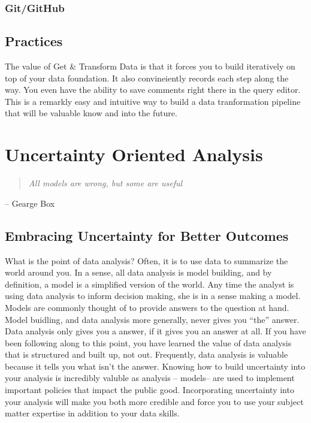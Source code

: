 \documentclass[]{book}
\begin{document}
\hypertarget{gitgithub}{%
\subsection{Git/GitHub}\label{gitgithub}}

\hypertarget{practices}{%
\section{Practices}\label{practices}}

The value of Get \& Transform Data is that it forces you to build iteratively on top of your data foundation. It also convineiently records each step along the way. You even have the ability to save comments right there in the query editor. This is a remarkly easy and intuitive way to build a data tranformation pipeline that will be valuable know and into the future.

\hypertarget{uncertainty-oriented-analysis}{%
\chapter{Uncertainty Oriented Analysis}\label{uncertainty-oriented-analysis}}

\begin{quote}
\emph{All models are wrong, but some are useful}
\end{quote}

-- Gearge Box

\hypertarget{embracing-uncertainty-for-better-outcomes}{%
\section{Embracing Uncertainty for Better Outcomes}\label{embracing-uncertainty-for-better-outcomes}}

What is the point of data analysis? Often, it is to use data to summarize the world around you. In a sense, all data analysis is model building, and by definition, a model is a simplified version of the world. Any time the analyst is using data analysis to inform decision making, she is in a sense making a model. Models are commonly thought of to provide answers to the question at hand. Model buidling, and data analysis more generally, never gives you ``the'' answer. Data analysis only gives you a answer, if it gives you an answer at all. If you have been following along to this point, you have learned the value of data analysis that is structured and built up, not out. Frequently, data analysis is valuable because it tells you what isn't the answer. Knowing how to build uncertainty into your analysis is incredibly valuble as analysis -- models-- are used to implement important policies that impact the public good. Incorporating uncertainty into your analysis will make you both more credible and force you to use your subject matter expertise in addition to your data skills.
\end{document}
